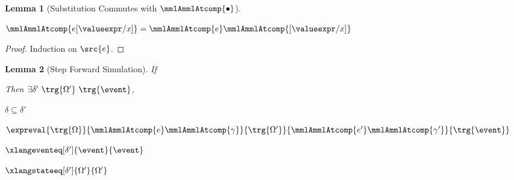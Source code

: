 \documentclass[a4paper,names,dvipsnames]{article}
\newtheorem{lemma}{Lemma}
\begin{document}
\begin{lemma}[Substitution Commutes with $\mmlAmmlAtcomp{\bullet}$]\label{lem:subst:commute:comp}$\;$
  \begin{goals}
    \item $\mmlAmmlAtcomp{e[\valueexpr/x]}=\mmlAmmlAtcomp{e}\mmlAmmlAtcomp{[\valueexpr/x]}$
  \end{goals}
\end{lemma}
\begin{proof}
  Induction on $\src{e}$.
\end{proof}


\begin{lemma}[Step Forward Simulation]\label{lem:step:forwardsim}
  If
  Then $\exists\delta'\ \trg{\Omega'}\ \trg{\event}$,
  \begin{goals}
    \item $\delta\subseteq\delta'$
    \item $\expreval{\trg{\Omega}}{\mmlAmmlAtcomp{e}\mmlAmmlAtcomp{\gamma}}{\trg{\Omega'}}{\mmlAmmlAtcomp{e'}\mmlAmmlAtcomp{\gamma'}}{\trg{\event}}$
    \item $\xlangeventeq[\delta']{\event}{\event}$
    \item $\xlangstateeq[\delta']{\Omega'}{\Omega'}$
  \end{goals}
\end{lemma}
\end{document}
